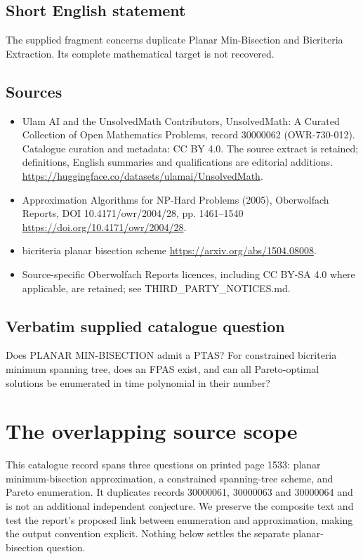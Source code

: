 \documentclass[11pt]{article}
\begin{document}
\subsection{Short English statement}
The supplied fragment concerns duplicate Planar Min-Bisection and Bicriteria Extraction. Its complete mathematical target is not recovered.
\subsection{Sources}
\begin{itemize}
\item[S1] Ulam AI and the UnsolvedMath Contributors, UnsolvedMath: A Curated Collection of Open Mathematics Problems, record 30000062 (OWR-730-012). Catalogue curation and metadata: CC BY 4.0. The source extract is retained; definitions, English summaries and qualifications are editorial additions.
\url{https://huggingface.co/datasets/ulamai/UnsolvedMath}.
\item[S2] Approximation Algorithms for NP-Hard Problems (2005), Oberwolfach Reports, DOI 10.4171/owr/2004/28, pp. 1461--1540
\url{https://doi.org/10.4171/owr/2004/28}.
\item[S3] bicriteria planar bisection scheme
\url{https://arxiv.org/abs/1504.08008}.
\item Source-specific Oberwolfach Reports licences, including CC BY-SA 4.0 where applicable, are retained; see THIRD\_PARTY\_NOTICES.md.
\end{itemize}
\subsection{Verbatim supplied catalogue question}
Does PLANAR MIN-BISECTION admit a PTAS? For constrained bicriteria minimum spanning tree, does an FPAS exist, and can all Pareto-optimal solutions be enumerated in time polynomial in their number?

\section{The overlapping source scope}
This catalogue record spans three questions on printed page 1533:
planar minimum-bisection approximation, a constrained spanning-tree
scheme, and Pareto enumeration. It duplicates records 30000061,
30000063 and 30000064 and is not an additional independent conjecture.
We preserve the composite text and test the report's proposed link
between enumeration and approximation, making the output convention
explicit. Nothing below settles the separate planar-bisection question.
\end{document}
